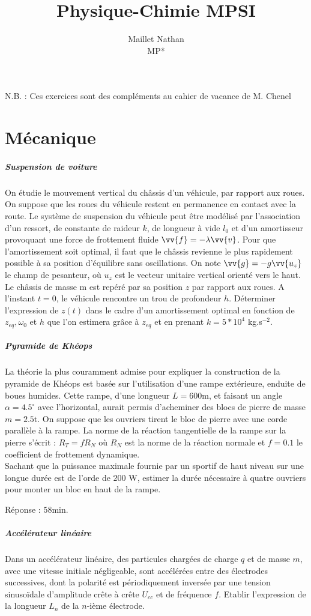 \documentclass[a4paper, 11pt, french]{article}
\title{Physique-Chimie MPSI}
\author{Maillet Nathan\\MP*}
\date{}
\newcommand{\al}{\alpha}
\newcommand{\la}{\lambda}
\newcommand{\om}{\omega}
\begin{document}
	\maketitle
	N.B. : Ces exercices sont des compléments au cahier de vacance de M. Chenel
	\section*{Mécanique}
	\subparagraph*{Suspension de voiture \\} 
		On étudie le mouvement vertical du châssis d'un véhicule, par rapport aux roues. On suppose que les roues du véhicule restent en permanence en contact avec la route. Le système de suspension du véhicule peut être modélisé par l'association d'un ressort, de constante de raideur $k$, de longueur à vide $l_0$ et d'un amortisseur provoquant une force de frottement fluide $\vv{f}=-\la \vv{v}$. Pour que l'amortissement soit optimal, il faut que le châssis revienne le plus rapidement possible à sa position d'équilibre sans oscillations. On note $\vv{g}=-g\vv{u_z}$ le champ de pesanteur, où $u_z$ est le vecteur unitaire vertical orienté vers le haut. Le châssis de masse m est repéré par sa position $z$ par rapport aux roues. A l'instant $t=0$, le véhicule rencontre un trou de profondeur $h$.
	Déterminer l'expression de $z(t)$ dans le cadre d'un amortissement optimal en fonction de $z_{eq},\om_0$ et $h$ que l'on estimera grâce à $z_{eq}$ et en prenant $k=5*10^4$ kg.s$^{-2}$.

	\subparagraph*{Pyramide de Khéops \\}
		La théorie la plus couramment admise pour expliquer la construction de la pyramide de Khéops est basée sur l'utilisation d'une rampe extérieure, enduite de boues humides. Cette rampe, d'une longueur $L=600$m, et faisant un angle $\al=4.5^{\circ}$ avec l'horizontal, aurait permis d'acheminer des blocs de pierre de masse $m=2.5$t. On suppose que les ouvriers tirent le bloc de pierre avec une corde parallèle à la rampe. La norme de la réaction tangentielle de la rampe sur la pierre s'écrit : $R_T=fR_N$ où $R_N$ est la norme de la réaction normale et $f=0.1$ le coefficient de frottement dynamique. \\
Sachant que la puissance maximale fournie par un sportif de haut niveau sur une longue durée est de l'orde de $200$ W, estimer la durée nécessaire à quatre ouvriers pour monter un bloc en haut de la rampe.


	Réponse : $58$min.

	\subparagraph*{Accélérateur linéaire \\}
		Dans un accélérateur linéaire, des particules chargées de charge $q$ et de masse $m$, avec une vitesse initiale négligeable, sont accélérées entre des électrodes successives, dont la polarité est périodiquement inversée par une tension sinusoïdale d'amplitude crête à crête $U_{cc}$ et de fréquence $f$. Etablir l'expression de la longueur $L_n$ de la $n$-ième électrode.
\end{document}
